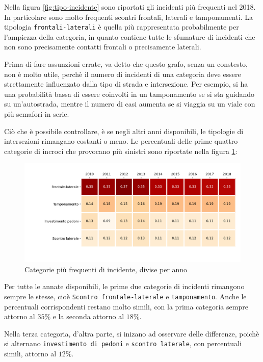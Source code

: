\documentclass[a4paper,12pt]{report}
\newcommand{\columnstyle}[1]{\texttt{#1}}
\begin{document}
Nella figura \ref{fig:tipo-incidente} sono riportati gli incidenti più frequenti nel 2018.
In particolare sono molto frequenti scontri frontali, laterali e tamponamenti. 
La tipologia \columnstyle{frontali-laterali} è quella più rappresentata probabilmente per 
l'ampiezza della categoria, in quanto contiene tutte le sfumature di incidenti che non sono 
precisamente contatti frontali o precisamente laterali.

Prima di fare assunzioni errate, va detto che questo grafo, senza un constesto, 
non è molto utile, perchè il numero di incidenti di una categoria deve 
essere strettamente influenzato dalla tipo di strada e intersezione. 
Per esempio, si ha una probabilità bassa di essere coinvolti in un tamponamento 
se si sta guidando su un'autostrada, mentre il numero di casi aumenta se si viaggia 
su un viale con più semafori in serie.

Ciò che è possibile controllare, è se negli altri anni disponibili, le 
tipologie di intersezioni rimangano costanti o meno.
Le percentuali delle prime quattro categorie di incroci che provocano più sinistri 
sono riportate nella figura \ref{fig:rapporto-tipologie}: 

\begin{figure}
    \includegraphics[width=\linewidth]{../src/incidenti/incidenti_senza_coords/localizzazione_incidente/rapporto_tipologie.png}
    \caption{Categorie più frequenti di incidente, divise per anno}
    \label{fig:rapporto-tipologie}
\end{figure}

Per tutte le annate disponibili, le prime due categorie di incidenti rimangono sempre 
le stesse, cioè \columnstyle{Scontro frontale-laterale} e \columnstyle{tamponamento}. 
Anche le percentuali corrispondenti restano molto simili, con la prima 
categoria sempre attorno al $35\%$ e la seconda attorno al $18\%$.

Nella terza categoria, d'altra parte, si inizano ad osservare delle differenze, 
poichè si alternano \columnstyle{investimento di pedoni} e \columnstyle{scontro laterale}, 
con percentuali simili, attorno al $12\%$.
\end{document}
